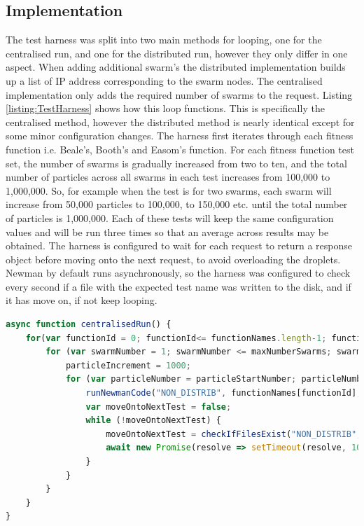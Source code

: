 \documentclass[oneside,12pt]{book}
\begin{document}
\subsection{Implementation}
The test harness was split into two main methods for looping, one for the centralised run, and one for the distributed run, however they only differ in one aspect. When adding additional swarm's the distributed implementation builds up a list of IP address corresponding to the swarm nodes. The centralised implementation only adds the required number of swarms to the request. Listing \ref{listing:TestHarness} shows how this loop functions. This is specifically the centralised method, however the distributed method is nearly identical except for some minor configuration changes. The harness first iterates through each fitness function i.e. Beale's, Booth's and Easom's function. For each fitness function test set, the number of swarms is gradually increased from two to ten, and the total number of particles across all swarms in each test increases from 100,000 to 1,000,000. So, for example when the test is for two swarms, each swarm will increase from 50,000 particles to 100,000, to 150,000 etc. until the total number of particles is 1,000,000. Each of these tests will keep the same configuration values and will be run three times so that an average across results may be obtained. The harness is configured to wait for each request to return a response object before moving onto the next request, to avoid overloading the droplets. Newman by default runs asynchronously, so the harness was configured to check every second if a file with the expected test name was written to the disk, and if it has move on, if not keep looping. 

\begin{lstlisting}[basicstyle=\footnotesize, language=JavaScript]
async function centralisedRun() {
    for(var functionId = 0; functionId<= functionNames.length-1; functionId ++) {
        for (var swarmNumber = 1; swarmNumber <= maxNumberSwarms; swarmNumber++) {
            particleIncrement = 1000;
            for (var particleNumber = particleStartNumber; particleNumber <= maxNumberParticles; particleNumber += particleIncrement) {
                runNewmanCode("NON_DISTRIB", functionNames[functionId], "Remote", swarmNumber, particleNumber, baseUrlStringsNonDistributed, nonDistribEndpoint);
                var moveOntoNextTest = false;
                while (!moveOntoNextTest) {
                    moveOntoNextTest = checkIfFilesExist("NON_DISTRIB", functionNames[functionId], swarmNumber, particleNumber);
                    await new Promise(resolve => setTimeout(resolve, 1000));
                }
            }
        }
    }
}
\end{lstlisting}
\label{listing:TestHarness}
\end{document}
